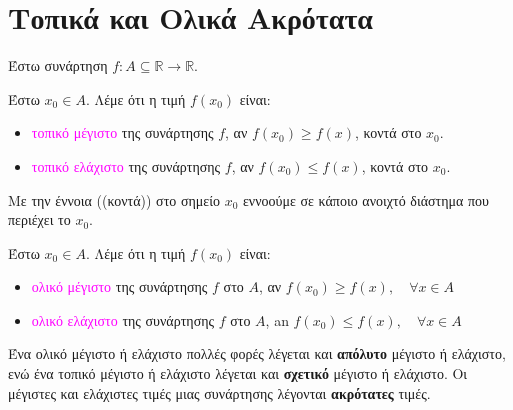 


\everymath{\displaystyle}





\chapter*{Τοπικά και Ολικά Ακρότατα}



Έστω συνάρτηση $ f \colon A \subseteq \mathbb{R} \to \mathbb{R} $.

\begin{dfn}
    Έστω $ x_{0} \in A $.  Λέμε ότι η τιμή $ f(x_{0}) $ είναι:
    \begin{itemize}
        \item \textcolor{magenta}{τοπικό μέγιστο}\phantom{a} της συνάρτησης $f$, αν $ f(x_{0}) \geq f(x) $, κοντά στο $ x_{0} $.
        \item \textcolor{magenta}{τοπικό ελάχιστο} της συνάρτησης $f$, αν $ f(x_{0}) \leq f(x) $, κοντά στο $ x_{0} $.
    \end{itemize}
\end{dfn}

Με την έννοια ((κοντά)) στο σημείο $ x_{0} $ εννοούμε σε κάποιο ανοιχτό διάστημα που περιέχει το $ x_{0} $.

\begin{dfn}
    Έστω $ x_{0} \in A $.  Λέμε ότι η τιμή $ f(x_{0}) $ είναι:
    \begin{itemize}
        \item \textcolor{magenta}{ολικό μέγιστο}\phantom{a} της συνάρτησης $f$ στο $ A $, αν $ f(x_{0}) \geq f(x),\quad \forall x \in A $
        \item \textcolor{magenta}{ολικό ελάχιστο} της συνάρτησης $f$ στο $ A $, an $ f(x_{0}) \leq f(x),\quad \forall x
            \in A $
    \end{itemize}
\end{dfn}

Ένα ολικό μέγιστο ή ελάχιστο πολλές φορές λέγεται και \textbf{απόλυτο} μέγιστο ή ελάχιστο, ενώ ένα
τοπικό μέγιστο ή ελάχιστο λέγεται και \textbf{σχετικό} μέγιστο ή ελάχιστο. Οι μέγιστες και
ελάχιστες τιμές μιας συνάρτησης λέγονται \textbf{ακρότατες} τιμές.

